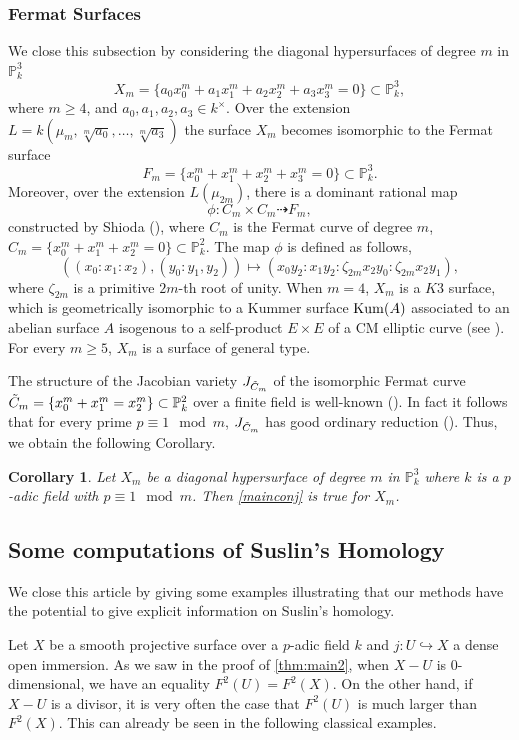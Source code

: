 \documentclass[12pt]{amsart}
\newtheorem{cor}[cor]{Corollary}
\theoremstyle{remark}
\renewcommand{\1}{{\mathbb{S}}}
\newcommand{\<}{\langle}
\renewcommand{\>}{\rangle}
\newcommand{\Kum}{{\rm Kum}}
\begin{document}
\subsubsection{Fermat Surfaces}\label{sec:Fermat} We close this subsection by considering the diagonal hypersurfaces of degree $m$ in $\mathbb{P}_k^3$
\[X_m=\{a_0x_0^m+a_1x_1^m+a_2x_2^m+a_3x_3^m=0\}\subset\mathbb{P}_k^3,\] where $m\geq 4$, and $a_0,a_1,a_2, a_3\in k^\times$. 
Over the extension $L=k(\mu_m,\sqrt[m]{a_0},\ldots, \sqrt[m]{a_3})$ the surface $X_m$ becomes isomorphic to the Fermat surface 
\[F_m=\{x_0^m+x_1^m+x_2^m+x_3^m=0\}\subset\mathbb{P}_k^3.\]
Moreover, over the extension $L(\mu_{2m})$, there is a dominant rational map 
\[\phi: C_m\times C_m\dashrightarrow F_m,\]
constructed by Shioda (\cite[(2.1)]{Shi}), where $C_m$ is the Fermat curve of degree $m$, $C_m=\{x_0^m+x_1^m+x_2^m=0\}\subset\mathbb{P}_k^2$. The map $\phi$ is defined as follows,
\[((x_0:x_1:x_2), (y_0:y_1,y_2))\mapsto(x_0y_2:x_1y_2:\zeta_{2m}x_2y_0:\zeta_{2m}x_2y_1),\] 
where $\zeta_{2m}$ is a primitive $2m$-th root of unity. 
When $m=4$, $X_m$ is a $K3$ surface, which is geometrically isomorphic to a Kummer surface $\Kum(A)$ associated to an abelian surface $A$ isogenous to a self-product $E\times E$ of a CM elliptic curve (see \cite[Subsection 2.4]{GL24}). For every $m\geq 5$, $X_m$ is a surface of general type. 

The structure of the Jacobian variety $J_{\Tilde{C}_m}$ of the isomorphic Fermat curve $\Tilde{C}_m=\{x_0^m+x_1^m=x_2^m\}\subset\mathbb{P}_k^2$ over a finite field is well-known (\cite{Yui}). In fact it follows that for every prime $p\equiv 1\mod m$, $J_{\Tilde{C}_m}$ has good ordinary reduction (\cite[Proposition 4.1, Theorem 4.2]{Yui}). Thus, we obtain the following Corollary.

\begin{cor}
   Let $X_m$ be a diagonal hypersurface of degree $m$ in $\mathbb{P}_k^3$ where $k$ is a $p$-adic field with  $p\equiv 1\mod m$. Then \autoref{mainconj} is true for $X_m$.  
\end{cor}


\subsection{Some computations of Suslin's Homology}\label{sec:Suscomputs} We close this article by giving some examples illustrating that our methods have the potential to give explicit information on Suslin's homology. 

Let $X$ be a smooth projective surface over a $p$-adic field $k$ and $j:U\hookrightarrow X$ a dense open immersion. 
As we saw in the proof of \autoref{thm:main2}, when $X-U$ is $0$-dimensional, we have an equality $F^2(U)=F^2(X)$.
On the other hand, if $X-U$ is a divisor, it is very often the case that $F^2(U)$ is much larger than $F^2(X)$. 
This can already be seen in the following classical examples. 
\end{document}
